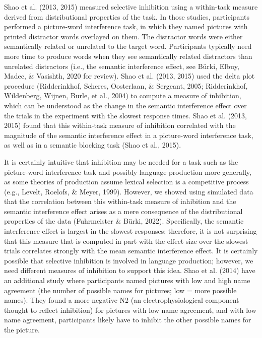 \documentclass[
  man,floatsintext]{apa6}
\begin{document}
Shao et al. (2013, 2015) measured selective inhibition using a within-task measure derived from distributional properties of the task. In those studies, participants performed a picture-word interference task, in which they named pictures with printed distractor words overlayed on them. The distractor words were either semantically related or unrelated to the target word. Participants typically need more time to produce words when they see semantically related distractors than unrelated distractors (i.e., the semantic interference effect, see Bürki, Elbuy, Madec, \& Vasishth, 2020 for review). Shao et al. (2013, 2015) used the delta plot procedure (Ridderinkhof, Scheres, Oosterlaan, \& Sergeant, 2005; Ridderinkhof, Wildenberg, Wijnen, Burle, et al., 2004) to compute a measure of inhibition, which can be understood as the change in the semantic interference effect over the trials in the experiment with the slowest response times. Shao et al. (2013, 2015) found that this within-task measure of inhibition correlated with the magnitude of the semantic interference effect in a picture-word interference task, as well as in a semantic blocking task (Shao et al., 2015).

It is certainly intuitive that inhibition may be needed for a task such as the picture-word interference task and possibly language production more generally, as some theories of production assume lexical selection is a competitive process (e.g., Levelt, Roelofs, \& Meyer, 1999). However, we showed using simulated data that the correlation between this within-task measure of inhibition and the semantic interference effect arises as a mere consequence of the distributional properties of the data (Fuhrmeister \& Bürki, 2022). Specifically, the semantic interference effect is largest in the slowest responses; therefore, it is not surprising that this measure that is computed in part with the effect size over the slowest trials correlates strongly with the mean semantic interference effect. It is certainly possible that selective inhibition is involved in language production; however, we need different measures of inhibition to support this idea. Shao et al. (2014) have an additional study where participants named pictures with low and high name agreement (the number of possible names for pictures; low = more possible names). They found a more negative N2 (an electrophysiological component thought to reflect inhibition) for pictures with low name agreement, and with low name agreement, participants likely have to inhibit the other possible names for the picture.
\end{document}
